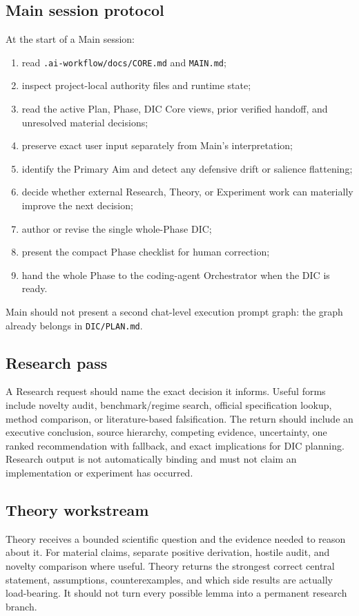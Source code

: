 \documentclass[11pt,a4paper]{article}
\begin{document}
\subsection{Main session protocol}
At the start of a Main session:
\begin{enumerate}
\item read \texttt{.ai-workflow/docs/CORE.md} and \texttt{MAIN.md};
\item inspect project-local authority files and runtime state;
\item read the active Plan, Phase, DIC Core views, prior verified handoff, and unresolved material decisions;
\item preserve exact user input separately from Main's interpretation;
\item identify the Primary Aim and detect any defensive drift or salience flattening;
\item decide whether external Research, Theory, or Experiment work can materially improve the next decision;
\item author or revise the single whole-Phase DIC;
\item present the compact Phase checklist for human correction;
\item hand the whole Phase to the coding-agent Orchestrator when the DIC is ready.
\end{enumerate}
Main should not present a second chat-level execution prompt graph: the graph already belongs in \texttt{DIC/PLAN.md}.

\subsection{Research pass}
A Research request should name the exact decision it informs. Useful forms include novelty audit, benchmark/regime search, official specification lookup, method comparison, or literature-based falsification. The return should include an executive conclusion, source hierarchy, competing evidence, uncertainty, one ranked recommendation with fallback, and exact implications for DIC planning. Research output is not automatically binding and must not claim an implementation or experiment has occurred.

\subsection{Theory workstream}
Theory receives a bounded scientific question and the evidence needed to reason about it. For material claims, separate positive derivation, hostile audit, and novelty comparison where useful. Theory returns the strongest correct central statement, assumptions, counterexamples, and which side results are actually load-bearing. It should not turn every possible lemma into a permanent research branch.
\end{document}
